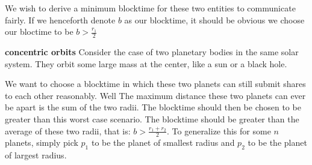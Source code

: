 \documentclass[conference]{IEEEtran}
\begin{document}
\begin{center}
\end{center}
We wish to derive a minimum blocktime for these two entities to communicate fairly. If we henceforth denote $b$ as our blocktime, it should be obvious we choose our bloctime to be $b > \frac{r_1}{2}$


\textbf{concentric orbits}
Consider the case of two planetary bodies in the same solar system. They orbit some large mass at the center, like a sun or a black hole. 
\begin{center}
\end{center}


We want to choose a blocktime in which these two planets can still submit shares to each other reasonably. Well The maximum distance these two planets can ever be apart is the sum of the two radii. The blocktime should then be chosen to be greater than this worst case scenario. The blocktime should be greater than the average of these two radii, that is: $b > \frac{r_1+r_2}{2}$. To generalize this for some $n$ planets, simply pick $p_1$ to be the planet of smallest radius and $p_2$ to be the planet of largest radius.
\end{document}
